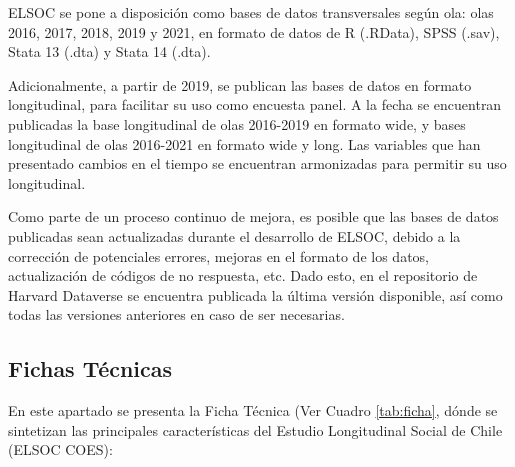 \documentclass[
  12pt,
]{article}
\begin{document}
ELSOC se pone a disposición como bases de datos transversales según ola: olas 2016, 2017, 2018, 2019 y 2021, en formato de datos de R (.RData), SPSS (.sav), Stata 13 (.dta) y Stata 14 (.dta).

Adicionalmente, a partir de 2019, se publican las bases de datos en formato longitudinal, para facilitar su uso como encuesta panel. A la fecha se encuentran publicadas la base longitudinal de olas 2016-2019 en formato wide, y bases longitudinal de olas 2016-2021 en formato wide y long. Las variables que han presentado cambios en el tiempo se encuentran armonizadas para permitir su uso longitudinal.

Como parte de un proceso continuo de mejora, es posible que las bases de datos publicadas sean actualizadas durante el desarrollo de ELSOC, debido a la corrección de potenciales errores, mejoras en el formato de los datos, actualización de códigos de no respuesta, etc. Dado esto, en el repositorio de Harvard Dataverse se encuentra publicada la última versión disponible, así como todas las versiones anteriores en caso de ser necesarias.

\hypertarget{fichas-tuxe9cnicas}{%
\subsection{Fichas Técnicas}\label{fichas-tuxe9cnicas}}

En este apartado se presenta la Ficha Técnica (Ver Cuadro \ref{tab:ficha}, dónde se sintetizan las principales características del Estudio Longitudinal Social de Chile (ELSOC COES):
\end{document}
